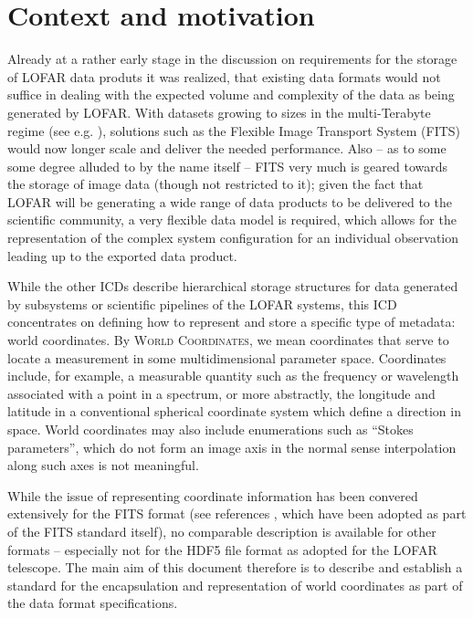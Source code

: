 \documentclass[a4paper,10pt,bibtotoc]{scrreprt}
\begin{document}
\section{Context and motivation}
\label{sec:context and motivation}

Already at a rather early stage in the discussion on requirements for
the storage of LOFAR data produts it was realized, that existing data
formats would not suffice in dealing with the expected volume and
complexity of the data as being generated by LOFAR. With datasets
growing to sizes in the multi-Terabyte regime (see
e.g. \cite{lofar.icd.003}), solutions such as the Flexible Image
Transport System (FITS) \cite{hanisch.2001} would now longer scale and
deliver the needed performance. Also -- as to some some degree alluded
to by the name itself -- FITS very much is geared towards the storage
of image data (though not restricted to it); given the fact that LOFAR
will be generating a wide range of data products to be delivered to the
scientific community, a very flexible data model is required, which
allows for the representation of the complex system configuration for
an individual observation leading up to the exported data product.

While the other ICDs \cite{lofar.icd.001,lofar.icd.003,lofar.icd.004,lofar.icd.006,lofar.icd.007,lofar.icd.008} describe hierarchical storage structures for data generated
by subsystems or scientific pipelines of the LOFAR systems, this ICD concentrates
on defining how to represent and store a specific type of metadata:
world coordinates. By \textsc{World Coordinates}, we mean coordinates
that serve to locate a measurement in some multidimensional parameter
space. Coordinates include, for example, a measurable quantity such as the
frequency or wavelength associated with a point in a spectrum, or more
abstractly, the longitude and latitude in a conventional spherical
coordinate system which define a direction in space. World coordinates
may also include enumerations such as ``Stokes parameters'', which do
not form an image axis in the normal sense interpolation along such
axes is not meaningful.

While the issue of representing coordinate information has been
convered extensively for the FITS format (see references
\cite{fits.paper1, fits.paper2, fits.paper3}, which have been adopted
as part of the FITS standard itself), no comparable description is available
for other formats -- especially not for the HDF5 file format \cite{hdf5.rm,hdf5.ug} as
adopted for the LOFAR telescope. The main aim of this document
therefore is to describe and establish a standard for the
encapsulation and representation of world coordinates as part of the
data format specifications.
\end{document}
